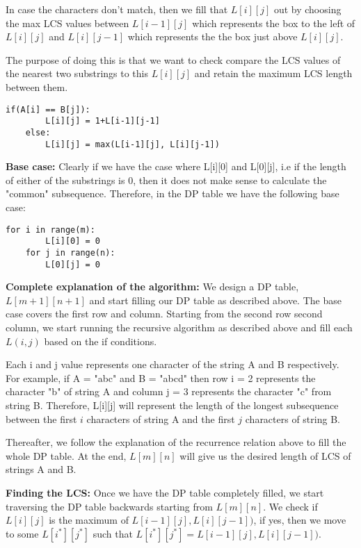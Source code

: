 \documentclass[letterpaper,11pt]{article}
\begin{document}
In case the characters don't match, then we fill that $L[i][j]$ out by choosing the max LCS values between $L[i-1][j]$ which represents the box to the left of $L[i][j]$ and $L[i][j-1]$ which represents the the box just above $L[i][j]$. 

The purpose of doing this is that we want to check compare the LCS values of the nearest two substrings to this $L[i][j]$ and retain the maximum LCS length between them.

\begin{Verbatim}[commandchars=\\\{\},codes={\catcode`$=3\catcode`_=8}]
    if(A[i] == B[j]):
        L[i][j] = 1+L[i-1][j-1]
    else:
        L[i][j] = max(L[i-1][j], L[i][j-1])
\end{Verbatim}

{\bf Base case:} Clearly if we have the case where L[i][0] and L[0][j], i.e if the length of either of the substrings is 0, then it does not make sense to calculate the "common" subsequence. Therefore, in the DP table we have the following base case:

\begin{Verbatim}[commandchars=\\\{\},codes={\catcode`$=3\catcode`_=8}]
    for i in range(m):
        L[i][0] = 0
    for j in range(n):
        L[0][j] = 0
\end{Verbatim}

{\bf Complete explanation of the algorithm: } We design a DP table, $L[m+1][n+1]$ and start filling our DP table as described above. The base case covers the first row and column. Starting from the second row second column, we start running the recursive algorithm as described above and fill each $L(i,j)$ based on the if conditions. 

Each i and j value represents one character of the string A and B respectively. For example, if A = "abc" and B = "abcd" then row i = 2 represents the character "b" of string A and column j = 3 represents the character "c" from string B. Therefore, L[i][j] will represent the length of the longest subsequence between the first $i$ characters of string A and the first $j$ characters of string B.

Thereafter, we follow the explanation of the recurrence relation above to fill the whole DP table. At the end, $L[m][n]$ will give us the desired length of LCS of strings A and B.

{\bf Finding the LCS: }
Once we have the DP table completely filled, we start traversing the DP table backwards starting from $L[m][n]$. We check if $L[i][j]$ is the maximum of $L[i-1][j], L[i][j-1])$, if yes, then we move to some $L[i^*][j^*]$ such that $L[i^*][j^*] =  L[i-1][j], L[i][j-1])$.
\end{document}
